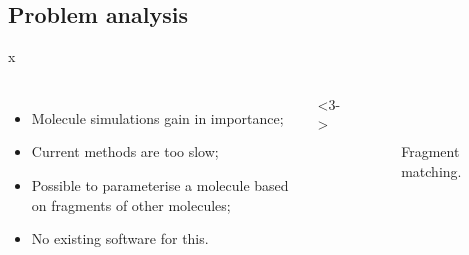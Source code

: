 \documentclass{beamer}
\newlength{\wideitemsep}
\let\olditem\item
\renewcommand{\item}[1][\wideitemsep]{\setlength{\itemsep}{#1}\olditem}
\begin{document}
\subsection{Problem analysis}
\begin{frame}{x}{}
  \begin{columns}
    \begin{itemize}
     \item<1-> Molecule simulations gain in importance;
     \item<2-> Current methods are too slow;
     \item<3-> Possible to parameterise a molecule based on fragments of other molecules;
     \item<4-> No existing software for this.
    \end{itemize}

   <3->
    \begin{figure}
     \vspace{-1em}
     \\[.3cm]
     \qquad
     \vspace{-.2cm}
     \caption{Fragment matching.}
    \end{figure}
  \end{columns}
\end{frame}
\end{document}
